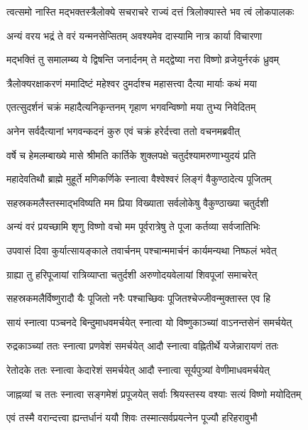 \twolineshloka
{त्वत्समो नास्ति मद्भक्तस्त्रैलोक्ये सचराचरे}
{राज्यं दत्तं त्रिलोक्यास्ते भव त्वं लोकपालकः} %

\twolineshloka
{अन्यं वरय भद्रं ते वरं यन्मनसेप्सितम्}
{अवश्यमेव दास्यामि नात्र कार्या विचारणा} %

\twolineshloka
{मद्भक्तिं तु समालम्ब्य ये द्विषन्ति जनार्दनम्}
{ते मद्द्वेष्या नरा विष्णो व्रजेयुर्नरकं ध्रुवम्} %


\twolineshloka
{त्रैलोक्यरक्षाकरणं ममादिष्टं महेश्वर}
{दुमर्दाश्च महासत्त्वा दैत्या मार्याः कथं मया} %

\twolineshloka
{एतत्सुदर्शनं चक्रं महादैत्यनिकृन्तनम्}
{गृहाण भगवन्विष्णो मया तुभ्य निवेदितम्} %

\twolineshloka
{अनेन सर्वदैत्यानां भगवन्कदनं कुरु}
{एवं चक्रं हरेर्दत्त्वा ततो वचनमब्रवीत्} %


\twolineshloka
{वर्षे च हेमलम्बाख्ये मासे श्रीमति कार्तिके}
{शुक्लपक्षे चतुर्दश्यामरुणाभ्युदयं प्रति} %

\twolineshloka
{महादेवतिथौ ब्राह्मे मुहूर्ते मणिकर्णिके}
{स्नात्वा वैश्वेश्वरं लिङ्गं वैकुण्ठादेत्य पूजितम्} %

\twolineshloka
{सहस्रकमलैस्तस्माद्भविष्यति मम प्रिया}
{विख्याता सर्वलोकेषु वैकुण्ठाख्या चतुर्दशी} %

\twolineshloka
{अन्यं वरं प्रयच्छामि शृणु विष्णो वचो मम}
{पूर्वरात्रेषु ते पूजा कर्तव्या सर्वजातिभिः} %

\twolineshloka
{उपवासं दिवा कुर्यात्सायङ्काले तवार्चनम्}
{पश्चान्ममार्चनं कार्यमन्यथा निष्फलं भवेत्} %

\twolineshloka
{ग्राह्या तु हरिपूजायां रात्रिव्याप्ता चतुर्दशी}
{अरुणोदयवेलायां शिवपूजां समाचरेत्} %

\twolineshloka
{सहस्रकमलैर्विष्णुरादौ यैः पूजितो नरैः}
{पश्चाच्छिवः पूजितश्चेज्जीवन्मुक्तास्त एव हि} %

\twolineshloka
{सायं स्नात्वा पञ्चनदे बिन्दुमाधवमर्चयेत्}
{स्नात्वा यो विष्णुकाञ्च्यां वाऽनन्तसेनं समर्चयेत्} %

\twolineshloka
{रुद्रकाञ्च्यां ततः स्नात्वा प्रणवेशं समर्चयेत्}
{आदौ स्नात्वा वह्नितीर्थे यजेन्नारायणं ततः} %

\twolineshloka
{रेतोदके ततः स्नात्वा केदारेशं समर्चयेत्}
{आदौ स्नात्वा सूर्यपुत्र्यां वेणीमाधवमर्चयेत्} %

\twolineshloka
{जाह्नव्यां च ततः स्नात्वा सङ्गमेशं प्रपूजयेत्}
{सर्वाः श्रियस्तस्य वश्याः सत्यं विष्णो मयोदितम्} %

\twolineshloka
{एवं तस्मै वरान्दत्त्वा ह्यन्तर्धानं ययौ शिवः}
{तस्मात्सर्वप्रयत्नेन पूज्यौ हरिहरावुभौ} %

